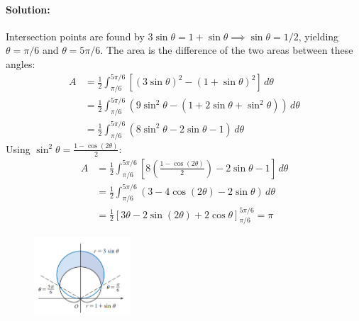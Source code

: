 \documentclass{article}
\begin{document}
\paragraph{Solution:} Intersection points are found by $3\sin\theta = 1 + \sin\theta \implies \sin\theta = 1/2$, yielding $\theta = \pi/6$ and $\theta = 5\pi/6$. The area is the difference of the two areas between these angles:
\begin{align*}
    A &= \frac{1}{2} \int_{\pi/6}^{5\pi/6} \left[ (3\sin\theta)^2 - (1 + \sin\theta)^2 \right] \, d\theta \\
    &= \frac{1}{2} \int_{\pi/6}^{5\pi/6} (9\sin^2\theta - (1 + 2\sin\theta + \sin^2\theta)) \, d\theta \\
    &= \frac{1}{2} \int_{\pi/6}^{5\pi/6} (8\sin^2\theta - 2\sin\theta - 1) \, d\theta
\end{align*}
Using $\sin^2\theta = \frac{1 - \cos(2\theta)}{2}$:
\begin{align*}
    A &= \frac{1}{2} \int_{\pi/6}^{5\pi/6} \left[ 8\left(\frac{1 - \cos(2\theta)}{2}\right) - 2\sin\theta - 1 \right] \, d\theta \\
    &= \frac{1}{2} \int_{\pi/6}^{5\pi/6} (3 - 4\cos(2\theta) - 2\sin\theta) \, d\theta \\
    &= \frac{1}{2} \left[ 3\theta - 2\sin(2\theta) + 2\cos\theta \right]_{\pi/6}^{5\pi/6} = \pi
\end{align*}
\begin{figure}[htbp]
    \centering
    \includegraphics[width=0.32\textwidth]{graph47.png}
\end{figure}
\end{document}
